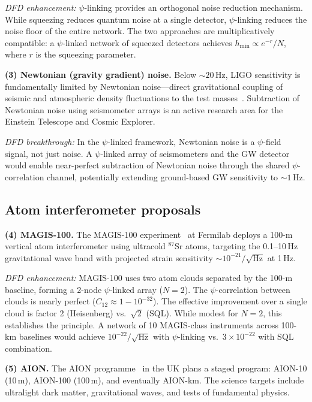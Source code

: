 \documentclass[aps,prl,twocolumn,superscriptaddress,showpacs]{revtex4-2}
\theoremstyle{definition}
\begin{document}
\textit{DFD enhancement:} $\psi$-linking provides an orthogonal
noise reduction mechanism. While squeezing reduces quantum noise at
a single detector, $\psi$-linking reduces the noise floor of the
entire network. The two approaches are multiplicatively compatible:
a $\psi$-linked network of squeezed detectors achieves
$h_{\min} \propto e^{-r}/N$, where $r$ is the squeezing parameter.

\textbf{(3) Newtonian (gravity gradient) noise.}
Below $\sim 20$\,Hz, LIGO sensitivity is fundamentally limited by
Newtonian noise---direct gravitational coupling of seismic and
atmospheric density fluctuations to the test masses~\cite{Hughes1998,Harms2015,Badaracco2020}.
Subtraction of Newtonian noise using seismometer arrays is an active
research area for the Einstein Telescope and Cosmic Explorer.

\textit{DFD breakthrough:} In the $\psi$-linked framework, Newtonian
noise is a $\psi$-field signal, not just noise. A $\psi$-linked array
of seismometers and the GW detector would enable near-perfect
subtraction of Newtonian noise through the shared $\psi$-correlation
channel, potentially extending ground-based GW sensitivity to
$\sim 1$\,Hz.

\subsection{Atom interferometer proposals}

\textbf{(4) MAGIS-100.}
The MAGIS-100 experiment~\cite{Abe2021} at Fermilab deploys a 100-m
vertical atom interferometer using ultracold $^{87}$Sr atoms, targeting
the 0.1--10\,Hz gravitational wave band with projected strain
sensitivity $\sim 10^{-21}/\sqrt{\mathrm{Hz}}$ at 1\,Hz.

\textit{DFD enhancement:} MAGIS-100 uses two atom clouds separated
by the 100-m baseline, forming a 2-node $\psi$-linked array
($N=2$). The $\psi$-correlation between clouds is nearly perfect
($C_{12} \approx 1 - 10^{-32}$). The effective improvement over
a single cloud is factor 2 (Heisenberg) vs.\ $\sqrt{2}$ (SQL).
While modest for $N=2$, this establishes the principle. A network
of 10 MAGIS-class instruments across 100-km baselines would achieve
$10^{-22}/\sqrt{\mathrm{Hz}}$ with $\psi$-linking vs.\
$3\times 10^{-22}$ with SQL combination.

\textbf{(5) AION.}
The AION programme~\cite{Badurina2020} in the UK plans a staged
program: AION-10 (10\,m), AION-100 (100\,m), and eventually
AION-km. The science targets include ultralight dark matter,
gravitational waves, and tests of fundamental physics.
\end{document}

